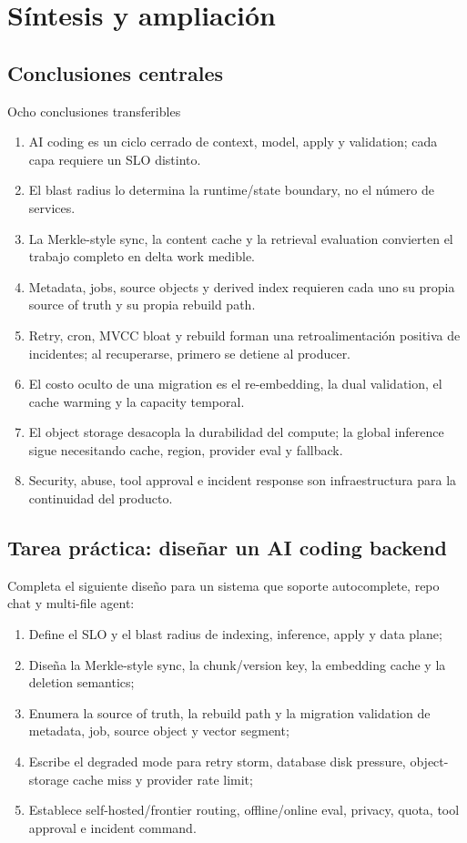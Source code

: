 \section{Síntesis y ampliación}

\subsection{Conclusiones centrales}

\begin{importantbox}{Ocho conclusiones transferibles}
\begin{enumerate}
  \item AI coding es un ciclo cerrado de context, model, apply y validation; cada capa requiere un SLO distinto.
  \item El blast radius lo determina la runtime/state boundary, no el número de services.
  \item La Merkle-style sync, la content cache y la retrieval evaluation convierten el trabajo completo en delta work medible.
  \item Metadata, jobs, source objects y derived index requieren cada uno su propia source of truth y su propia rebuild path.
  \item Retry, cron, MVCC bloat y rebuild forman una retroalimentación positiva de incidentes; al recuperarse, primero se detiene al producer.
  \item El costo oculto de una migration es el re-embedding, la dual validation, el cache warming y la capacity temporal.
  \item El object storage desacopla la durabilidad del compute; la global inference sigue necesitando cache, region, provider eval y fallback.
  \item Security, abuse, tool approval e incident response son infraestructura para la continuidad del producto.
\end{enumerate}
\end{importantbox}

\subsection{Tarea práctica: diseñar un AI coding backend}

Completa el siguiente diseño para un sistema que soporte autocomplete, repo chat y multi-file agent:

\begin{enumerate}
  \item Define el SLO y el blast radius de indexing, inference, apply y data plane;
  \item Diseña la Merkle-style sync, la chunk/version key, la embedding cache y la deletion semantics;
  \item Enumera la source of truth, la rebuild path y la migration validation de metadata, job, source object y vector segment;
  \item Escribe el degraded mode para retry storm, database disk pressure, object-storage cache miss y provider rate limit;
  \item Establece self-hosted/frontier routing, offline/online eval, privacy, quota, tool approval e incident command.
\end{enumerate}

